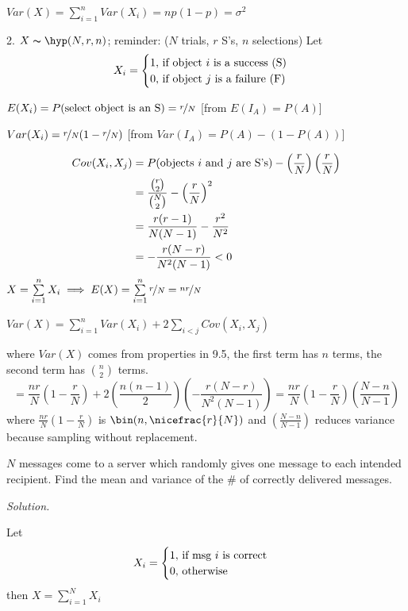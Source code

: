 $ Var(X)=\sum\limits_{i=1}^{n} Var(X_i)=np(1-p)=\sigma^2 $

2. $ X \thicksim \hyp(N,r,n) $; reminder: 
($ N $ trials, $ r $ S's, $ n $ selections)
Let
\[X_i=\begin{cases}
    1,\,\text{if object $ i $ is a success (S)}\\
    0,\,\text{if object $ j $ is a failure (F)}
\end{cases} \]

$ E(X_i)=P(\text{select object is an S})=\nicefrac{r}{N} $
[from $E(I_A)=P(A)$]

$ Var(X_i)=\nicefrac{r}{N} (1-\nicefrac{r}{N} ) $
[from $ Var(I_A)=P(A)-(1-P(A)) $]

\begin{align*}
    Cov(X_i,X_j)
    &=P(\text{objects $ i $ and $ j $ are S's})-
    \left(\frac{r}{N}\right)\left(\frac{r}{N}\right)\\
    &=\frac{\binom{r}{2}}{\binom{N}{2}}-\left(\frac{r}{N}\right)^2\\
    &=\frac{r(r-1)}{N(N-1)} -\frac{r^2}{N^2}\\
    &=-\frac{r(N-r)}{N^2(N-1)}<0  
\end{align*}
$ X=\sum\limits_{i=1}^{n} X_i\implies E(X)=\sum\limits_{i=1}^{n} \nicefrac{r}{N} =
\nicefrac{nr}{N} $

$ Var(X)=\sum\limits_{i=1}^{n} Var(X_i)+2 \sum\limits_{i<j} Cov(X_i,X_j)  $

where $ Var(X) $ comes from properties in 9.5, the first term has $ n $ terms,
the second term has $ \binom{n}{2} $ terms.
\[=\frac{nr}{N} \left(1-\frac{r}{N}\right)+2\left(\frac{n(n-1)}{2}\right)
\left(-\frac{r(N-r)}{N^2(N-1)}\right)=\frac{nr}{N} \left(1-\frac{r}{N}\right)
\left(\frac{N-n}{N-1}\right) \]
where $ \frac{nr}{N} \left(1-\frac{r}{N}\right)$ is $\bin(n,\nicefrac{r}{N}) $
and $ \left(\frac{N-n}{N-1}\right) $ reduces variance because sampling without replacement.


$ N $ messages come to a server which randomly gives one message to each
intended recipient. Find the mean and variance of the \# of correctly delivered
messages.

\emph{Solution.}

Let
\[ X_i=
\begin{cases}
    1,\,\text{if msg $ i $ is correct}\\
    0,\,\text{otherwise}
\end{cases} \]
then $ X=\sum\limits_{i=1}^{N}X_i $

